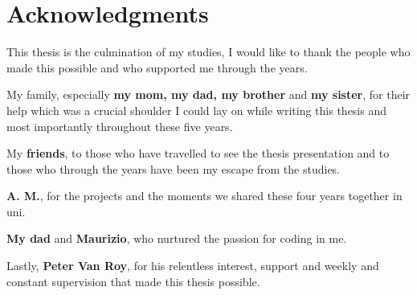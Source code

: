 \chapter*{Acknowledgments}
    This thesis is the culmination of my studies, I would like to thank the people who made this possible and who supported me through the years.
    
    \forceindent My family, especially \textbf{my mom, my dad, my brother} and \textbf{my sister}, for their help which was a crucial shoulder I could lay on while writing this thesis and most importantly throughout these five years.
    
    \indent My \textbf{friends}, to those who have travelled to see the thesis presentation and to those who through the years have been my escape from the studies. 

    \indent \textbf{A. M.}, for the projects and the moments we shared these four years together in uni.

    \indent \textbf{My dad} and \textbf{Maurizio}, who nurtured the passion for coding in me.

    \indent Lastly, \textbf{Peter Van Roy}, for his relentless interest, support and weekly and constant supervision that made this thesis possible. 

